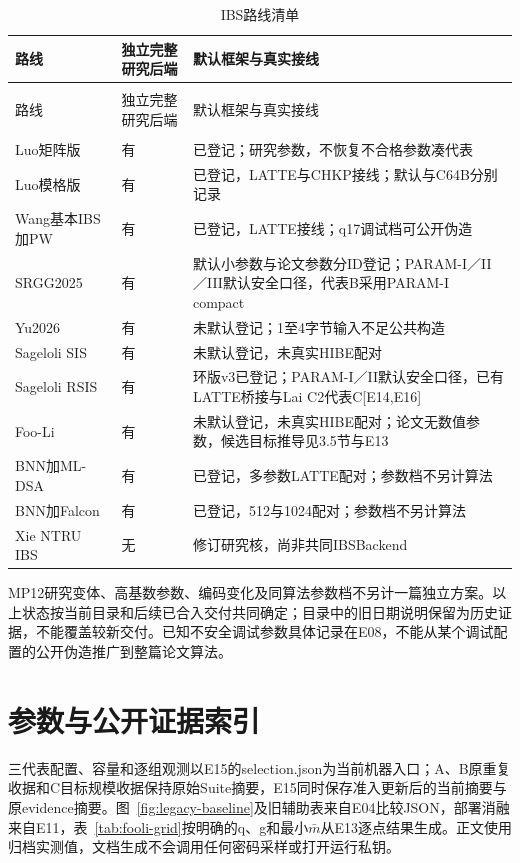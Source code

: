 \documentclass[UTF8,a4paper,12pt,oneside,openany,fontset=fandol]{ctexrep}
\newlength{\tableavail}
\begin{document}
\begin{longtable}{@{}>{\raggedright\arraybackslash}p{0.24\tableavail}>{\raggedright\arraybackslash}p{0.2\tableavail}>{\raggedright\arraybackslash}p{0.56\tableavail}@{}}
\caption{IBS路线清单}\label{tab:ibs-inventory}\\
\toprule
\rowcolor{black!8} 路线 & 独立完整研究后端 & 默认框架与真实接线 \\
\midrule
\endfirsthead
\multicolumn{3}{l}{\small 表\thetable\quad 续表}\\
\toprule
\rowcolor{black!8} 路线 & 独立完整研究后端 & 默认框架与真实接线 \\
\midrule
\endhead
\midrule
\multicolumn{3}{r}{\small 接下页}\\
\endfoot
\bottomrule
\endlastfoot
Luo矩阵版 & 有 & 已登记；研究参数，不恢复不合格参数凑代表 \\
Luo模格版 & 有 & 已登记，LATTE与CHKP接线；默认与C64B分别记录 \\
Wang基本IBS加PW & 有 & 已登记，LATTE接线；q17调试档可公开伪造 \\
SRGG2025 & 有 & 默认小参数与论文参数分ID登记；PARAM-I／II／III默认安全口径，代表B采用PARAM-I compact \\
Yu2026 & 有 & 未默认登记；1至4字节输入不足公共构造 \\
Sageloli SIS & 有 & 未默认登记，未真实HIBE配对 \\
Sageloli RSIS & 有 & 环版v3已登记；PARAM-I／II默认安全口径，已有LATTE桥接与Lai C2代表C[E14,E16] \\
Foo-Li & 有 & 未默认登记，未真实HIBE配对；论文无数值参数，候选目标推导见3.5节与E13 \\
BNN加ML-DSA & 有 & 已登记，多参数LATTE配对；参数档不另计算法 \\
BNN加Falcon & 有 & 已登记，512与1024配对；参数档不另计算法 \\
Xie NTRU IBS & 无 & 修订研究核，尚非共同IBSBackend \\
\end{longtable}
\endgroup
MP12研究变体、高基数参数、编码变化及同算法参数档不另计一篇独立方案。以上状态按当前目录和后续已合入交付共同确定；目录中的旧日期说明保留为历史证据，不能覆盖较新交付。已知不安全调试参数具体记录在E08，不能从某个调试配置的公开伪造推广到整篇论文算法。

\chapter{参数与公开证据索引}
三代表配置、容量和逐组观测以E15的selection.json为当前机器入口；A、B原重复收据和C目标规模收据保持原始Suite摘要，E15同时保存准入更新后的当前摘要与原evidence摘要。图~\ref{fig:legacy-baseline}及旧辅助表来自E04比较JSON，部署消融来自E11，表~\ref{tab:fooli-grid}按明确的q、g和最小\ensuremath{\bar m}从E13逐点结果生成。正文使用归档实测值，文档生成不会调用任何密码采样或打开运行私钥。
\end{document}
